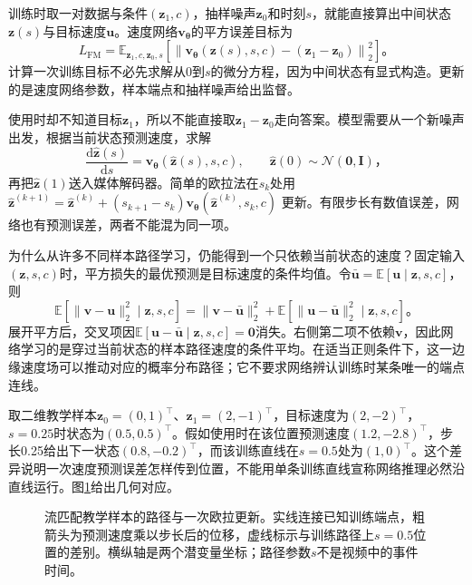 训练时取一对数据与条件$(\bm z_1,c)$，抽样噪声$\bm z_0$和时刻$s$，就能直接算出中间状态$\bm z(s)$与目标速度$\bm u$。速度网络$\bm v_{\bm\theta}$的平方误差目标为
\begin{equation}
  L_{\mathrm{FM}}
  =\mathbb E_{\bm z_1,c,\bm z_0,s}
     \left[
       \left\lVert
         \bm v_{\bm\theta}(\bm z(s),s,c)
           -(\bm z_1-\bm z_0)
       \right\rVert_2^2
     \right]\text{。}
  \label{eq:vision-flow-loss}
\end{equation}
计算一次训练目标不必先求解从0到$s$的微分方程，因为中间状态有显式构造。更新的是速度网络参数，样本端点和抽样噪声给出监督。

使用时却不知道目标$\bm z_1$，所以不能直接取$\bm z_1-\bm z_0$走向答案。模型需要从一个新噪声出发，根据当前状态预测速度，求解
\begin{equation}
  \frac{\mathrm d\widehat{\bm z}(s)}{\mathrm ds}
    =\bm v_{\bm\theta}(\widehat{\bm z}(s),s,c),
  \qquad
  \widehat{\bm z}(0)\sim\mathcal N(\bm0,\bm I)\text{，}
  \label{eq:vision-flow-ode}
\end{equation}
再把$\widehat{\bm z}(1)$送入媒体解码器。简单的欧拉法在$s_k$处用
$\widehat{\bm z}^{(k+1)}
=\widehat{\bm z}^{(k)}+(s_{k+1}-s_k)
\bm v_{\bm\theta}(\widehat{\bm z}^{(k)},s_k,c)$
更新。有限步长有数值误差，网络也有预测误差，两者不能混为同一项。

为什么从许多不同样本路径学习，仍能得到一个只依赖当前状态的速度？固定输入$(\bm z,s,c)$时，平方损失的最优预测是目标速度的条件均值。令$\bar{\bm u}=\mathbb E[\bm u\mid\bm z,s,c]$，则
\[
  \mathbb E[\lVert\bm v-\bm u\rVert_2^2\mid\bm z,s,c]
  =\lVert\bm v-\bar{\bm u}\rVert_2^2+
    \mathbb E[\lVert\bm u-\bar{\bm u}\rVert_2^2\mid\bm z,s,c]\text{。}
\]
展开平方后，交叉项因$\mathbb E[\bm u-\bar{\bm u}\mid\bm z,s,c]=\bm0$消失。右侧第二项不依赖$\bm v$，因此网络学习的是穿过当前状态的样本路径速度的条件平均。在适当正则条件下，这一边缘速度场可以推动对应的概率分布路径；它不要求网络辨认训练时某条唯一的端点连线。

取二维教学样本$\bm z_0=(0,1)^\top$、$\bm z_1=(2,-1)^\top$，目标速度为$(2,-2)^\top$，$s=0.25$时状态为$(0.5,0.5)^\top$。假如使用时在该位置预测速度$(1.2,-2.8)^\top$，步长0.25给出下一状态$(0.8,-0.2)^\top$，而该训练直线在$s=0.5$处为$(1,0)^\top$。这个差异说明一次速度预测误差怎样传到位置，不能用单条训练直线宣称网络推理必然沿直线运行。图\ref{fig:vision-flow-step}给出几何对应。

\begin{figure}[htbp]
  \centering
  
  \caption{流匹配教学样本的路径与一次欧拉更新。实线连接已知训练端点，粗箭头为预测速度乘以步长后的位移，虚线标示与训练路径上$s=0.5$位置的差别。横纵轴是两个潜变量坐标；路径参数$s$不是视频中的事件时间。}
  \label{fig:vision-flow-step}
\end{figure}

